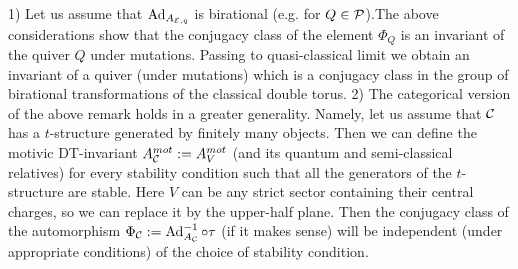 \documentclass[12pt]{article}
\begin{document}
\begin{rmk} 1) Let us assume  that $ \operatorname{Ad}_{A_{{\cal E},q}}$ is birational (e.g. for $Q\in {\cal P}$).The above considerations show that the conjugacy class of the element ${\Phi}_Q$ is an invariant of the quiver $Q$ under mutations. Passing to quasi-classical limit we obtain an invariant of a quiver (under mutations) which is a conjugacy class in the group of birational transformations of the classical double torus.
2) The categorical version of the above remark holds in a greater generality. Namely, let us assume that ${\mathcal C}$ has a $t$-structure generated by finitely many objects. Then we can define the motivic DT-invariant $A_{{\mathcal C}}^{mot}:=A_{V}^{mot}$ (and its quantum and semi-classical relatives) for every stability condition such that all the generators of the $t$-structure are stable. Here $V$ can be any strict sector containing their central charges, so we can replace it by the upper-half plane.   Then  the conjugacy class of the automorphism $\Phi_{{\mathcal C}}:= \operatorname{Ad}_{A_{\mathcal C}}^{-1}\circ \tau$ (if it makes sense) will be 
independent (under appropriate conditions) of the choice of stability condition.
 

\end{rmk}























\end{document}
